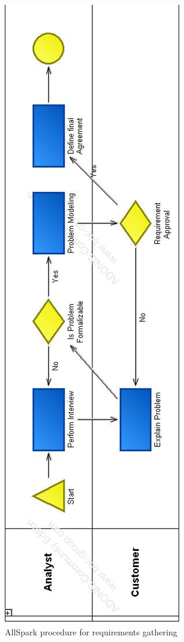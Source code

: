 \begin{figure}
\centering
\includegraphics[scale=0.50]{adonis_diagrams/gather}
\caption{AllSpark procedure for requirements gathering}
\label{img:gathering}
\end{figure}

